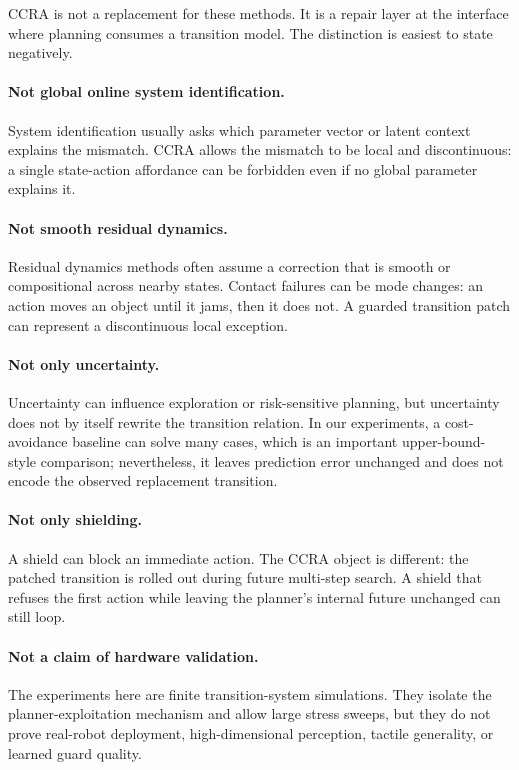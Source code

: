 \documentclass{article}
\begin{document}
CCRA is not a replacement for these methods. It is a repair layer at the interface where planning consumes a transition model. The distinction is easiest to state negatively.

\paragraph{Not global online system identification.}
System identification usually asks which parameter vector or latent context explains the mismatch. CCRA allows the mismatch to be local and discontinuous: a single state-action affordance can be forbidden even if no global parameter explains it.

\paragraph{Not smooth residual dynamics.}
Residual dynamics methods often assume a correction that is smooth or compositional across nearby states. Contact failures can be mode changes: an action moves an object until it jams, then it does not. A guarded transition patch can represent a discontinuous local exception.

\paragraph{Not only uncertainty.}
Uncertainty can influence exploration or risk-sensitive planning, but uncertainty does not by itself rewrite the transition relation. In our experiments, a cost-avoidance baseline can solve many cases, which is an important upper-bound-style comparison; nevertheless, it leaves prediction error unchanged and does not encode the observed replacement transition.

\paragraph{Not only shielding.}
A shield can block an immediate action. The CCRA object is different: the patched transition is rolled out during future multi-step search. A shield that refuses the first action while leaving the planner's internal future unchanged can still loop.

\paragraph{Not a claim of hardware validation.}
The experiments here are finite transition-system simulations. They isolate the planner-exploitation mechanism and allow large stress sweeps, but they do not prove real-robot deployment, high-dimensional perception, tactile generality, or learned guard quality.
\end{document}
